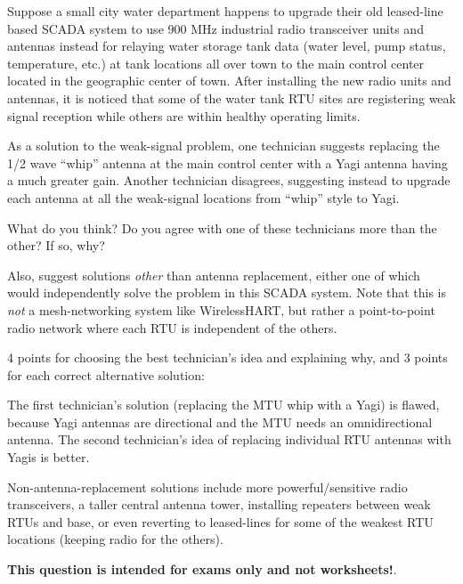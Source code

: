 

Suppose a small city water department happens to upgrade their old leased-line based SCADA system to use 900 MHz industrial radio transceiver units and antennas instead for relaying water storage tank data (water level, pump status, temperature, etc.) at tank locations all over town to the main control center located in the geographic center of town.  After installing the new radio units and antennas, it is noticed that some of the water tank RTU sites are registering weak signal reception while others are within healthy operating limits.

As a solution to the weak-signal problem, one technician suggests replacing the 1/2 wave ``whip'' antenna at the main control center with a Yagi antenna having a much greater gain.  Another technician disagrees, suggesting instead to upgrade each antenna at all the weak-signal locations from ``whip'' style to Yagi.

\vskip 20pt

What do you think?  Do you agree with one of these technicians more than the other?  If so, why?

\vskip 100pt

Also, suggest  solutions {\it other} than antenna replacement, either one of which would independently solve the problem in this SCADA system.  Note that this is {\it not} a mesh-networking system like WirelessHART, but rather a point-to-point radio network where each RTU is independent of the others.

\vskip 100pt







4 points for choosing the best technician's idea and explaining why, and 3 points for each correct alternative solution:

\vskip 10pt

The first technician's solution (replacing the MTU whip with a Yagi) is flawed, because Yagi antennas are directional and the MTU needs an omnidirectional antenna.  The second technician's idea of replacing individual RTU antennas with Yagis is better.
 
\vskip 10pt

Non-antenna-replacement solutions include more powerful/sensitive radio transceivers, a taller central antenna tower, installing repeaters between weak RTUs and base, or even reverting to leased-lines for some of the weakest RTU locations (keeping radio for the others).







{\bf This question is intended for exams only and not worksheets!}.



